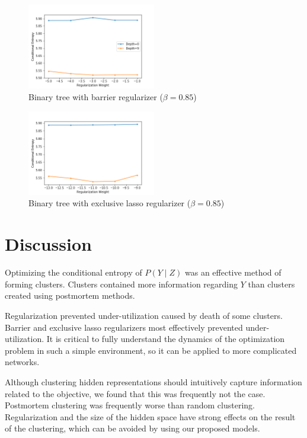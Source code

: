 \documentclass[11pt,letterpaper]{article}
\begin{document}
\begin{figure}
  \caption{Binary tree with barrier regularizer ($\beta=0.85$)}
\label{f:btb}
  \centering
    \includegraphics[width=0.5\textwidth]{skipgram_tree_b_0.png}
\end{figure}
\begin{figure}
  \caption{Binary tree with exclusive lasso regularizer ($\beta=0.85$)}
\label{f:btel}
  \centering
    \includegraphics[width=0.5\textwidth]{skipgram_tree_el_0.png}
\end{figure}

\section{Discussion}

Optimizing the conditional entropy of $P(Y\mid Z)$ was an effective method of forming clusters. Clusters contained more information regarding $Y$ than clusters created using postmortem methods.

Regularization prevented under-utilization caused by death of some clusters. Barrier and exclusive lasso regularizers most effectively prevented under-utilization. It is critical to fully understand the dynamics of the optimization problem in such a simple environment, so it can be applied to more complicated networks.

Although clustering hidden representations should intuitively capture information related to the objective, we found that this was frequently not the case. Postmortem clustering was frequently worse than random clustering. Regularization and the size of the hidden space have strong effects on the result of the clustering, which can be avoided by using our proposed models.
\end{document}
